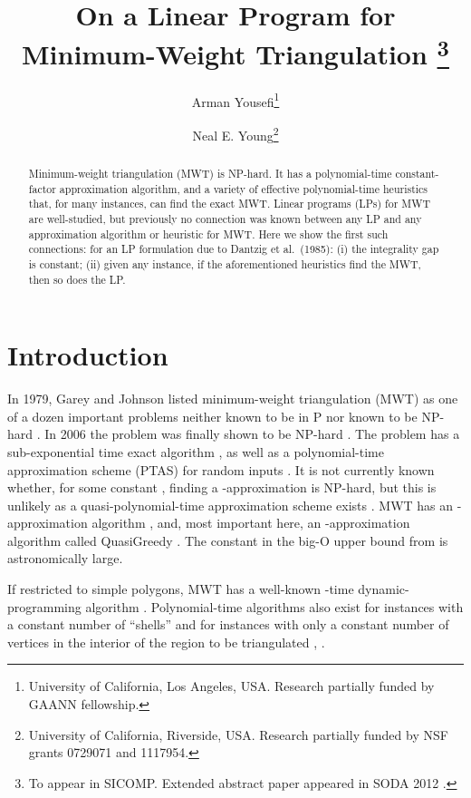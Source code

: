 \documentclass[final]{siamltex}
\title{On a Linear Program for Minimum-Weight Triangulation
\thanks{To appear in SICOMP. Extended abstract paper appeared in SODA 2012 \cite{yousefi2012linear,yousefi2013linear}.}}
\author{Arman Yousefi\thanks{University of California, Los Angeles, USA.
    Research partially funded by GAANN fellowship.
}
\and
Neal E. Young\thanks{University of California, Riverside, USA.
  Research partially funded by NSF grants 0729071 and 1117954.
}
}
\begin{document}
\maketitle

\begin{abstract}
Minimum-weight triangulation (MWT) is NP-hard.
It has a polynomial-time constant-factor approximation algorithm,
and a variety of effective polynomial-time heuristics that, for many instances, can find the exact MWT.
Linear programs (LPs) for MWT are well-studied,
but previously no connection was known between any LP
and any approximation algorithm or heuristic for MWT.
Here we show the first such connections:
for an LP formulation due to Dantzig et al.~(1985):
(i) the integrality gap is constant;
(ii) given any instance, if the aforementioned heuristics find the MWT, then so does the LP.
\end{abstract}




\section{Introduction}

In 1979, Garey and Johnson listed minimum-weight triangulation (MWT) 
as one of a dozen important problems neither known to be in P 
nor known to be NP-hard \cite{garey1979computers}.
In 2006 the problem was finally shown to be NP-hard \cite{mulzer2008minimum}.
The problem has a sub-exponential time exact algorithm \cite{smith1988studies},
as well as a polynomial-time approximation scheme (PTAS) 
for random inputs \cite{golin1996limit}.
It is not currently known whether, for some constant ,
finding a -approximation is NP-hard,
but this is unlikely as a quasi-polynomial-time approximation scheme exists \cite{remy2009quasi}.
MWT has an -approximation algorithm \cite{plaisted1987heuristic},
and, most important here,
an -approximation algorithm
called {\sc QuasiGreedy} \cite{krznaric1998quasi}.
The constant in the big-O upper bound from \cite{krznaric1998quasi}
is astronomically large.

If restricted to simple polygons, MWT
has a well-known -time dynamic-programming algorithm 
\cite{gilbert1979new,klincsek1980minimal}.
Polynomial-time algorithms also exist for instances with a constant number of ``shells''
\cite{anagnostou1993polynomial}
and for instances with only a constant number of vertices in the interior of the 
region  to be triangulated
\cite[\S 2.5.1]{Giannopoulos:2007cx},
\cite{hoffmann2006minimum,borgelt2008fixed,spillner5faster,knauer2006fixed}.
\end{document}
